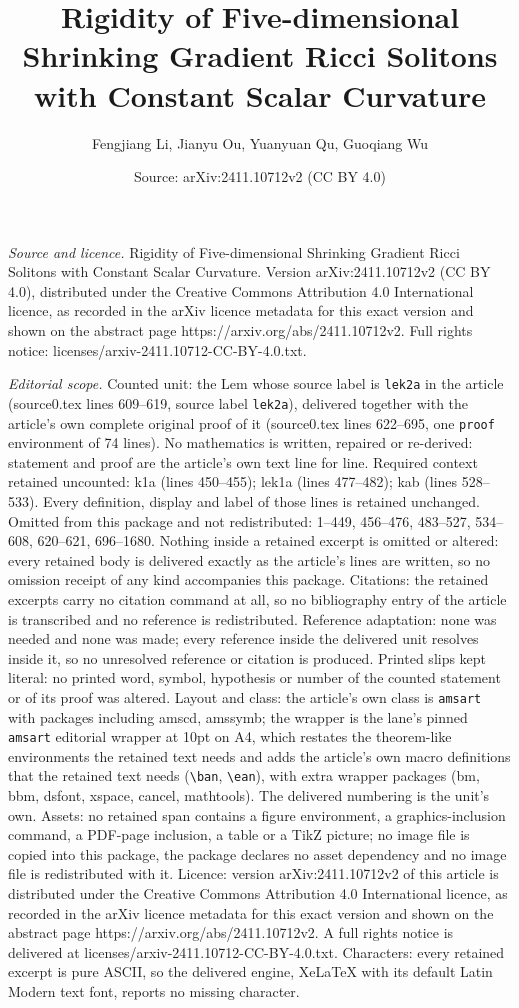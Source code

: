 \documentclass[10pt,a4paper]{amsart}
\title[Rigidity of Five-dimensional Shrinking Gradient Ricci Solito]{Rigidity of Five-dimensional Shrinking Gradient Ricci Solitons with Constant Scalar Curvature}
\author{Fengjiang Li, Jianyu Ou, Yuanyuan Qu, Guoqiang Wu}
\date{Source: arXiv:2411.10712v2 (CC BY 4.0)}
\begin{document}
\maketitle

\noindent\emph{Source and licence.} Rigidity of Five-dimensional Shrinking Gradient Ricci Solitons with Constant Scalar Curvature. Version arXiv:2411.10712v2 (CC BY 4.0), distributed under the Creative Commons Attribution 4.0 International licence, as recorded in the arXiv licence metadata for this exact version and shown on the abstract page https://arxiv.org/abs/2411.10712v2. Full rights notice: licenses/arxiv-2411.10712-CC-BY-4.0.txt.\par\smallskip

\noindent\textit{Editorial scope.} Counted unit: the Lem whose source label is \texttt{lek2a} in the article (source0.tex lines 609--619, source label \texttt{lek2a}), delivered together with the article's own complete original proof of it (source0.tex lines 622--695, one \texttt{proof} environment of 74 lines). No mathematics is written, repaired or re-derived: statement and proof are the article's own text line for line. Required context retained uncounted: k1a (lines 450--455); lek1a (lines 477--482); kab (lines 528--533). Every definition, display and label of those lines is retained unchanged. Omitted from this package and not redistributed: 1--449, 456--476, 483--527, 534--608, 620--621, 696--1680. Nothing inside a retained excerpt is omitted or altered: every retained body is delivered exactly as the article's lines are written, so no omission receipt of any kind accompanies this package. Citations: the retained excerpts carry no citation command at all, so no bibliography entry of the article is transcribed and no reference is redistributed. Reference adaptation: none was needed and none was made; every reference inside the delivered unit resolves inside it, so no unresolved reference or citation is produced. Printed slips kept literal: no printed word, symbol, hypothesis or number of the counted statement or of its proof was altered. Layout and class: the article's own class is \texttt{amsart} with packages including amscd, amssymb; the wrapper is the lane's pinned \texttt{amsart} editorial wrapper at 10pt on A4, which restates the theorem-like environments the retained text needs and adds the article's own macro definitions that the retained text needs (\texttt{\textbackslash ban}, \texttt{\textbackslash ean}), with extra wrapper packages (bm, bbm, dsfont, xspace, cancel, mathtools). The delivered numbering is the unit's own. Assets: no retained span contains a figure environment, a graphics-inclusion command, a PDF-page inclusion, a table or a TikZ picture; no image file is copied into this package, the package declares no asset dependency and no image file is redistributed with it. Licence: version arXiv:2411.10712v2 of this article is distributed under the Creative Commons Attribution 4.0 International licence, as recorded in the arXiv licence metadata for this exact version and shown on the abstract page https://arxiv.org/abs/2411.10712v2. A full rights notice is delivered at licenses/arxiv-2411.10712-CC-BY-4.0.txt. Characters: every retained excerpt is pure ASCII, so the delivered engine, XeLaTeX with its default Latin Modern text font, reports no missing character.
\end{document}

